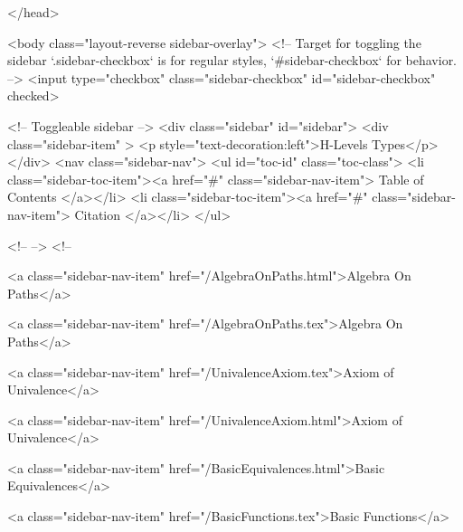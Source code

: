   
</head>




  <body class="layout-reverse sidebar-overlay">
    <!-- Target for toggling the sidebar `.sidebar-checkbox` is for regular
     styles, `#sidebar-checkbox` for behavior. -->
<input type="checkbox" class="sidebar-checkbox" id="sidebar-checkbox" checked>

<!-- Toggleable sidebar -->
<div class="sidebar" id="sidebar">
  <div class="sidebar-item" >
    <p style="text-decoration:left">H-Levels Types</p>
  </div>
  <nav class="sidebar-nav">
    <ul id="toc-id" class="toc-class">
  <li class="sidebar-toc-item"><a href="#" class="sidebar-nav-item"> Table of Contents </a></li>
  <li class="sidebar-toc-item"><a href="#" class="sidebar-nav-item"> Citation </a></li>
</ul>


    <!--  -->
    <!-- 
      
    
      
    
      
    
      
    
      
        
      
    
      
        
          <a class="sidebar-nav-item" href="/AlgebraOnPaths.html">Algebra On Paths</a>
        
      
    
      
        
          <a class="sidebar-nav-item" href="/AlgebraOnPaths.tex">Algebra On Paths</a>
        
      
    
      
        
          <a class="sidebar-nav-item" href="/UnivalenceAxiom.tex">Axiom of Univalence</a>
        
      
    
      
        
          <a class="sidebar-nav-item" href="/UnivalenceAxiom.html">Axiom of Univalence</a>
        
      
    
      
        
          <a class="sidebar-nav-item" href="/BasicEquivalences.html">Basic Equivalences</a>
        
      
    
      
        
          <a class="sidebar-nav-item" href="/BasicFunctions.tex">Basic Functions</a>
        

